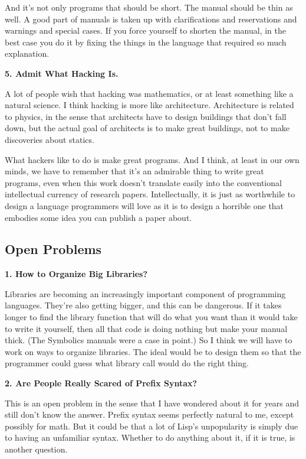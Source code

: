 And it's not only programs that should be short. The manual should be
thin as well. A good part of manuals is taken up with clarifications and
reservations and warnings and special cases. If you force yourself to
shorten the manual, in the best case you do it by fixing the things in
the language that required so much explanation.

\textbf{5. Admit What Hacking Is.}

A lot of people wish that hacking was mathematics, or at least something
like a natural science. I think hacking is more like architecture.
Architecture is related to physics, in the sense that architects have to
design buildings that don't fall down, but the actual goal of architects
is to make great buildings, not to make discoveries about statics.

What hackers like to do is make great programs. And I think, at least in
our own minds, we have to remember that it's an admirable thing to write
great programs, even when this work doesn't translate easily into the
conventional intellectual currency of research papers. Intellectually,
it is just as worthwhile to design a language programmers will love as
it is to design a horrible one that embodies some idea you can publish a
paper about.

\subsection{Open Problems}\label{open-problems}

\textbf{1. How to Organize Big Libraries?}

Libraries are becoming an increasingly important component of
programming languages. They're also getting bigger, and this can be
dangerous. If it takes longer to find the library function that will do
what you want than it would take to write it yourself, then all that
code is doing nothing but make your manual thick. (The Symbolics manuals
were a case in point.) So I think we will have to work on ways to
organize libraries. The ideal would be to design them so that the
programmer could guess what library call would do the right thing.

\textbf{2. Are People Really Scared of Prefix Syntax?}

This is an open problem in the sense that I have wondered about it for
years and still don't know the answer. Prefix syntax seems perfectly
natural to me, except possibly for math. But it could be that a lot of
Lisp's unpopularity is simply due to having an unfamiliar syntax.
Whether to do anything about it, if it is true, is another question.

